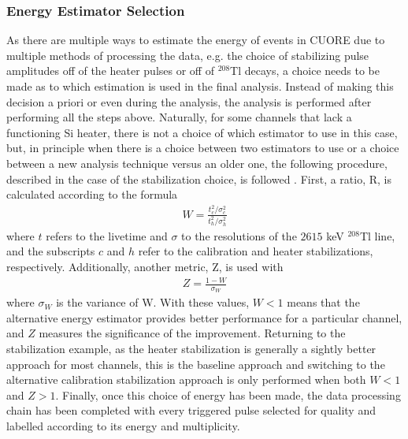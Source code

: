 \subsubsection*{Energy Estimator Selection}
As there are multiple ways to estimate the energy of events in CUORE due to multiple methods of processing the data, e.g. the choice of stabilizing pulse amplitudes off of the heater pulses or off of $^{208}$Tl decays, a choice needs to be made as to which estimation is used in the final analysis.
Instead of making this decision a priori or even during the analysis, the analysis is performed after performing all the steps above.
Naturally, for some channels that lack a functioning Si heater, there is not a choice of which estimator to use in this case, but, in principle when there is a choice between two estimators to use or a choice between a new analysis technique versus an older one, the following procedure, described in the case of the stabilization choice, is followed \cite{PRL2017_InternalNote}.
First, a ratio, R, is calculated according to the formula
\begin{align}
    W=\frac{t_c^2/\sigma_c^2}{t_h^2/\sigma_h^2}
\end{align}
where $t$ refers to the livetime and $\sigma$ to the resolutions of the $2615$ keV $^{208}$Tl line, and the subscripts $c$ and $h$ refer to the calibration and heater stabilizations, respectively.
Additionally, another metric, Z, is used with
\begin{align}
    Z = \frac{1-W}{\sigma_W}
\end{align}
where $\sigma_W$ is the variance of W.
With these values, $W<1$ means that the alternative energy estimator provides better performance for a particular channel, and $Z$ measures the significance of the improvement.
Returning to the stabilization example, as the heater stabilization is generally a sightly better approach for most channels, this is the baseline approach and switching to the alternative calibration stabilization approach is only performed when both $W<1$ and $Z>1$.
Finally, once this choice of energy has been made, the data processing chain has been completed with every triggered pulse selected for quality and labelled according to its energy and multiplicity.